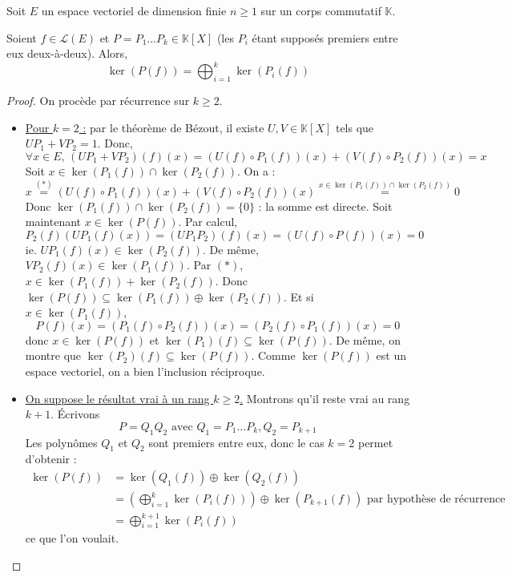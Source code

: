 






  Soit $E$ un espace vectoriel de dimension finie $n \geq 1$ sur un corps commutatif $\mathbb{K}$.

  \begin{theorem}
    \label{lemme-des-noyaux-1}
    Soient $f \in \mathcal{L}(E)$ et $P = P_1 \dots P_k \in \mathbb{K}[X]$ (les $P_i$ étant supposés premiers entre eux deux-à-deux). Alors,
    \[ \ker(P(f)) = \bigoplus_{i = 1}^k \ker(P_i(f)) \]
  \end{theorem}

  \begin{proof}
    On procède par récurrence sur $k \geq 2$.
    \begin{itemize}
      \item \uline{Pour $k = 2$ :} par le théorème de Bézout, il existe $U, V \in \mathbb{K}[X]$ tels que $UP_1 + VP_2 = 1$. Donc,
      \[ \forall x \in E, \, (UP_1 + VP_2)(f)(x) = (U(f) \circ P_1(f))(x) + (V(f) \circ P_2(f))(x) = x \tag{$*$} \]
      Soit $x \in \ker(P_1(f)) \cap \ker(P_2(f))$. On a :
      \[ x \overset{(*)}{=} (U(f) \circ P_1(f))(x) + (V(f) \circ P_2(f))(x) \overset{x \in \ker(P_1(f)) \cap \ker(P_2(f))}{=} 0 \]
      Donc $\ker(P_1(f)) \cap \ker(P_2(f)) = \{ 0 \}$ : la somme est directe.
      \newpar
      Soit maintenant $x \in \ker(P(f))$. Par calcul,
      \[ P_2(f)(UP_1(f)(x)) = (UP_1P_2)(f)(x) = (U(f) \circ P(f))(x) = 0 \]
      ie. $UP_1(f)(x) \in \ker(P_2(f))$. De même, $VP_2(f)(x) \in \ker(P_1(f))$. Par $(*)$, $x \in \ker(P_1(f)) + \ker(P_2(f))$. Donc $\ker(P(f)) \subseteq \ker(P_1(f)) \oplus \ker(P_2(f))$.
      \newpar
      Et si $x \in \ker(P_1(f))$,
      \[ P(f)(x) = (P_1(f) \circ P_2(f))(x) = (P_2(f) \circ P_1(f))(x) = 0 \]
      donc $x \in \ker(P(f))$ et $\ker(P_1)(f) \subseteq \ker(P(f))$. De même, on montre que $\ker(P_2)(f) \subseteq \ker(P(f))$. Comme $\ker(P(f))$ est un espace vectoriel, on a bien l'inclusion réciproque.
      \item \uline{On suppose le résultat vrai à un rang $k \geq 2$.} Montrons qu'il reste vrai au rang $k+1$. Écrivons
      \[ P = Q_1Q_2 \text{ avec } Q_1 = P_1 \dots P_k, Q_2 = P_{k+1} \]
      Les polynômes $Q_1$ et $Q_2$ sont premiers entre eux, donc le cas $k = 2$ permet d'obtenir :
      \begin{align*}
        \ker(P(f)) &= \ker(Q_1(f)) \oplus \ker(Q_2(f)) \\
        &= \left( \bigoplus_{i = 1}^k \ker(P_i(f)) \right) \oplus \ker(P_{k+1}(f)) \text{ par hypothèse de récurrence} \\
        &= \bigoplus_{i = 1}^{k+1} \ker(P_i(f))
      \end{align*}
      ce que l'on voulait.
    \end{itemize}
  \end{proof}

